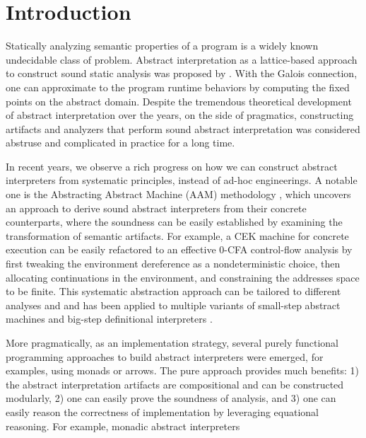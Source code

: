\section{Introduction} \label{intro}

Statically analyzing semantic properties of a program is a widely known
undecidable class of problem. Abstract interpretation as a lattice-based
approach to construct sound static analysis was proposed by
\citet{DBLP:conf/popl/CousotC77}. With the Galois connection, one can
approximate to the program runtime behaviors by computing the fixed points on
the abstract domain. Despite the tremendous theoretical development of abstract
interpretation over the years, on the side of pragmatics, constructing
artifacts and analyzers that perform sound abstract interpretation was 
considered abstruse and complicated in practice for a long time.

In recent years, we observe a rich progress on how we can construct abstract
interpreters from systematic principles, instead of ad-hoc engineerings. A
notable one is the Abstracting Abstract Machine (AAM) methodology
\cite{DBLP:journals/jfp/HornM12, DBLP:conf/icfp/HornM10}, which uncovers an
approach to derive sound abstract interpreters from their concrete counterparts,
where the soundness can be easily established by examining the transformation of
semantic artifacts. For example, a CEK machine
\cite{DBLP:conf/popl/FelleisenF87} for concrete execution can be easily
refactored to an effective 0-CFA control-flow analysis
\cite{Shivers:1988:CFA:53990.54007, Midtgaard:2012:CAF:2187671.2187672} by first
tweaking the environment dereference as a nondeterministic choice, then
allocating continuations in the environment, and constraining the addresses
space to be finite. This systematic abstraction approach can be tailored to
different analyses  and and has been applied to multiple variants of
small-step abstract machines \cite{DBLP:journals/jfp/HornM12,
DBLP:conf/icfp/HornM10, Sergey:2013:MAI:2491956.2491979} and big-step
definitional interpreters \cite{Wei:2018:RAA:3243631.3236800,
DBLP:journals/pacmpl/DaraisLNH17, Keidel:2018:CSP:3243631.3236767}.

More pragmatically, as an implementation strategy, several purely functional
programming approaches to build abstract interpreters were emerged, for
examples, using monads or arrows. The pure approach provides much benefits: 1)
the abstract interpretation artifacts are compositional and can be constructed
modularly, 2) one can easily prove the soundness of analysis, and 3) one can
easily reason the correctness of implementation by leveraging equational
reasoning. For example, monadic abstract interpreters 

